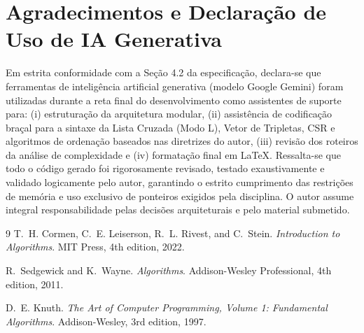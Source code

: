 \documentclass[letterpaper]{article}
\begin{document}
\section*{Agradecimentos e Declaração de Uso de IA Generativa}
Em estrita conformidade com a Seção 4.2 da especificação, declara-se que ferramentas de inteligência artificial generativa (modelo Google Gemini) foram utilizadas durante a reta final do desenvolvimento como assistentes de suporte para: (i) estruturação da arquitetura modular, (ii) assistência de codificação braçal para a sintaxe da Lista Cruzada (Modo L), Vetor de Tripletas, CSR e algoritmos de ordenação baseados nas diretrizes do autor, (iii) revisão dos roteiros da análise de complexidade e (iv) formatação final em \LaTeX. Ressalta-se que todo o código gerado foi rigorosamente revisado, testado exaustivamente e validado logicamente pelo autor, garantindo o estrito cumprimento das restrições de memória e uso exclusivo de ponteiros exigidos pela disciplina. O autor assume integral responsabilidade pelas decisões arquiteturais e pelo material submetido.

\begin{thebibliography}{9}
T.~H. Cormen, C.~E. Leiserson, R.~L. Rivest, and C.~Stein.
\newblock \textit{Introduction to Algorithms}.
\newblock MIT Press, 4th edition, 2022.

R.~Sedgewick and K.~Wayne.
\newblock \textit{Algorithms}.
\newblock Addison-Wesley Professional, 4th edition, 2011.

D.~E. Knuth.
\newblock \textit{The Art of Computer Programming, Volume 1: Fundamental Algorithms}.
\newblock Addison-Wesley, 3rd edition, 1997.
\end{thebibliography}
\end{document}
